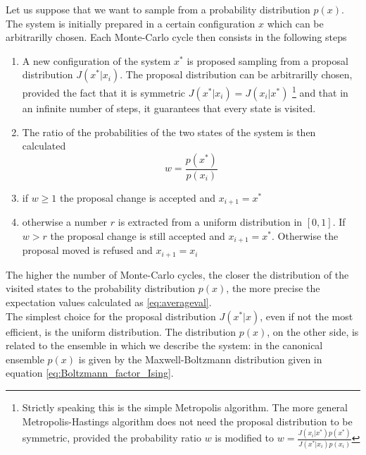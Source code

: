 \vspace{10pt}
Let us suppose that we want to sample from a probability distribution $p(x)$. \\
The system is initially prepared in a certain configuration $x$ which can be arbitrarilly chosen. Each Monte-Carlo cycle then consists in the following steps
\begin{enumerate}
    \item A new configuration of the system $x^*$ is proposed sampling from a proposal distribution $J(x^*|x_i)$. The proposal distribution can be arbitrarilly chosen, provided the fact that it is symmetric $J(x^*|x_i) = J(x_i|x^*)$
    \footnote{Strictly speaking this is the simple Metropolis algorithm. The more general Metropolis-Hastings algorithm does not need the proposal distribution to be symmetric, provided the probability ratio $w$ is modified to $w=\frac{J(x_i|x^*)p(x^*)}{J(x^*|x_i)p(x_i)}$}
    and that in an infinite number of steps, it guarantees that every state is visited.
    \item The ratio of the probabilities of the two states of the system is then calculated
    \begin{equation*}
        w = \frac{p(x^*)}{p(x_i)}
    \end{equation*}
    \item if $w \geq 1$ the proposal change is accepted and $x_{i+1} = x^*$
    \item otherwise a number $r$ is extracted from a uniform distribution in $[0,1]$. If $w > r$ the proposal change is still accepted and $x_{i+1} = x^*$. Otherwise the proposal moved is refused and $x_{i+1} = x_i$
\end{enumerate}
The higher the number of Monte-Carlo cycles, the closer the distribution of the visited states to the probability distribution $p(x)$, the more precise the expectation values calculated as \ref{eq:averageval}. \\
The simplest choice for the proposal distribution $J(x^*|x)$, even if not the most efficient, is the uniform distribution. The distribution $p(x)$, on the other side, is related to the ensemble 
in which we describe the system: in the canonical ensemble $p(x)$ is given by the Maxwell-Boltzmann distribution given in equation \ref{eq:Boltzmann_factor_Ising}.
\newpage

